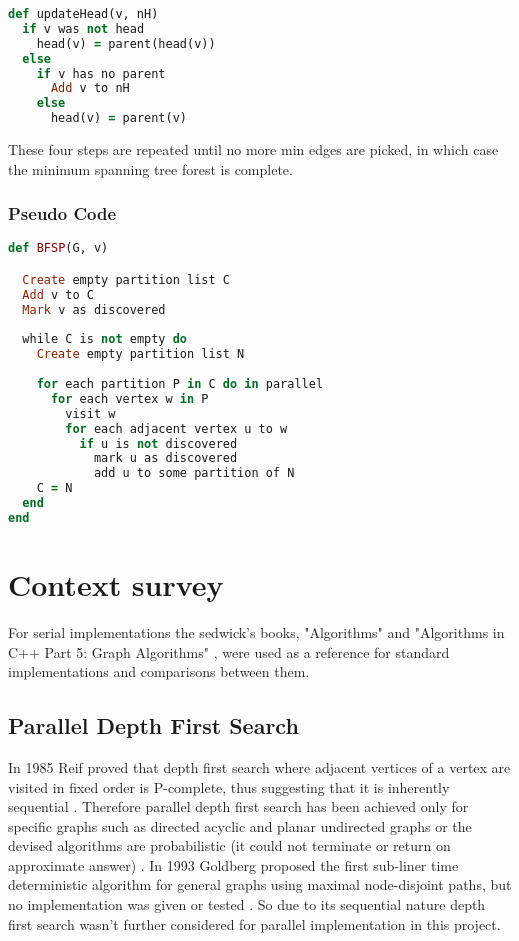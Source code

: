 \documentclass{report}
\theoremstyle{plain}
\theoremstyle{definition}
\theoremstyle{remark}
\begin{document}
\begin{lstlisting}[language=Ruby]
def updateHead(v, nH)
  if v was not head
    head(v) = parent(head(v))
  else
    if v has no parent
      Add v to nH
    else
      head(v) = parent(v)
\end{lstlisting}

These four steps are repeated until no more min edges are picked, in which case the minimum spanning tree forest is complete.

\subsection*{Pseudo Code} 
\begin{lstlisting}[language=Ruby]
def BFSP(G, v)

  Create empty partition list C
  Add v to C
  Mark v as discovered
  
  while C is not empty do
    Create empty partition list N
  	
    for each partition P in C do in parallel
      for each vertex w in P
        visit w
        for each adjacent vertex u to w
          if u is not discovered  	      
            mark u as discovered
            add u to some partition of N
    C = N
  end
end
\end{lstlisting}

\chapter{Context survey}

For serial implementations the sedwick's books, "Algorithms" \cite{algo_sedgewick} and "Algorithms in C++ Part 5: Graph Algorithms" \cite{c++_sedgewick}, were used as a reference for standard implementations and comparisons between them.

\section{Parallel Depth First Search}

In 1985 Reif proved that depth first search where adjacent vertices of a vertex are visited in fixed order is P-complete, thus suggesting that it is inherently sequential \cite{reif1985depth}. Therefore parallel depth first search has been achieved only for specific graphs such as directed acyclic \cite{ghosh1984parallel} and planar undirected graphs \cite{hagerup1990planar} or the devised algorithms are probabilistic (it could not terminate or return on approximate answer) \cite{aggarwal1989parallel}. In 1993 Goldberg proposed the first sub-liner time deterministic algorithm for general graphs using maximal node-disjoint paths, but no implementation was given or tested \cite{goldberg1993sublinear}. So due to its sequential nature depth first search wasn't further considered for parallel implementation in this project.
\end{document}
